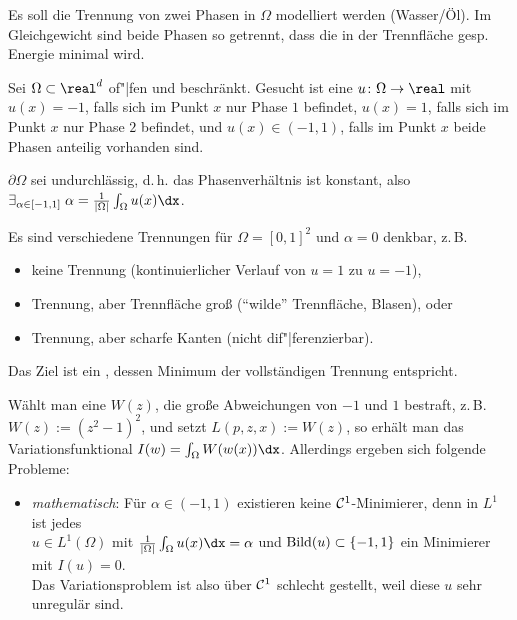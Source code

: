 \begin{Bsp}
    Es soll die Trennung von zwei Phasen in $\Omega$ modelliert werden (Wasser/Öl).
    Im Gleichgewicht sind beide Phasen so getrennt,
    dass die in der Trennfläche gesp. Energie minimal wird.

    Sei $\Omega \subset \real^d$ of"|fen und beschränkt.
    Gesucht ist eine  $u\colon \Omega \to \real$ mit\\
    $u(x) = -1$, falls sich im Punkt $x$ nur Phase $1$ befindet,
    $u(x) = 1$, falls sich im Punkt $x$ nur Phase $2$ befindet, und
    $u(x) \in (-1, 1)$, falls im Punkt $x$ beide Phasen anteilig vorhanden sind.

    $\partial\Omega$ sei undurchlässig, d.\,h. das Phasenverhältnis ist konstant,
    also
    $\exists_{\alpha \in [-1, 1]}\; \alpha = \frac{1}{|\Omega|} \int_\Omega u(x) \dx$.

    Es sind verschiedene Trennungen für $\Omega = [0, 1]^2$ und $\alpha = 0$ denkbar, z.\,B.
    \begin{itemize}
        \item
        keine Trennung (kontinuierlicher Verlauf von $u = 1$ zu $u = -1$),

        \item
        Trennung, aber Trennfläche groß ("`wilde"' Trennfläche, Blasen), oder

        \item
        Trennung, aber scharfe Kanten (nicht dif"|ferenzierbar).
    \end{itemize}
    Das Ziel ist ein , dessen Minimum der vollständigen Trennung
    entspricht.

    Wählt man eine  $W(z)$, die große Abweichungen von $-1$ und $1$
    bestraft, z.\,B. $W(z) := (z^2-1)^2$, und setzt $L(p, z, x) := W(z)$,
    so erhält man das Variationsfunktional $I(w) = \int_\Omega W(w(x)) \dx$.
    Allerdings ergeben sich folgende Probleme:
    \begin{itemize}
        \item
        \emph{mathematisch}:
        Für $\alpha \in (-1, 1)$ existieren keine $\mathcal{C}^1$-Minimierer, denn in $L^1$ ist jedes\\
        $u \in L^1(\Omega)$ mit $\frac{1}{|\Omega|} \int_\Omega u(x) \dx = \alpha$ und
        $\operatorname{Bild}(u) \subset \{-1, 1\}$ ein Minimierer mit $I(u) = 0$.\\
        Das Variationsproblem ist also über $\mathcal{C}^1$ schlecht gestellt,
        weil diese $u$ sehr unregulär sind.


\end{itemize}
\end{Bsp}
